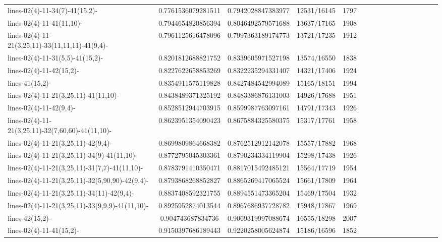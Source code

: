 \documentclass[12pt]{report}			%
\begin{document}
\begin{landscape}
\begin{longtable}{ | p{5cm} | *{15}{c|}}
lines-02(4)-11-34(7)-41(15,2)-                    & 0.7761536079281511  & 0.7942028847383977  & 12531/16145 & 1797 \\
lines-02(4)-11-41(11,10)-                         & 0.7944654820856394  & 0.8046492579571688  & 13637/17165 & 1908 \\
lines-02(4)-11-21(3,25,11)-33(11,11,11)-41(9,4)-   & 0.7961125616478096  & 0.7997363189174773  & 13721/17235 & 1912 \\
lines-02(4)-11-31(5,5)-41(15,2)-                  & 0.8201812688821752  & 0.8339605971527198  & 13574/16550 & 1838 \\
lines-02(4)-11-42(15,2)-                          & 0.8227622658853269  & 0.8322235294331407  & 14321/17406 & 1924 \\
lines-41(15,2)-                                   & 0.8354911575119828  & 0.8427484542994089  & 15165/18151 & 1994 \\
lines-02(4)-11-21(3,25,11)-41(11,10)-             & 0.8438489371325192  & 0.8483386876131003  & 14926/17688 & 1951 \\
lines-02(4)-11-42(9,4)-                           & 0.8528512944703915  & 0.8599987763097161  & 14791/17343 & 1926 \\
lines-02(4)-11-21(3,25,11)-32(7,60,60)-41(11,10)- & 0.8623951354090423  & 0.8675884325580375  & 15317/17761 & 1958 \\
lines-02(4)-11-21(3,25,11)-42(9,4)-               & 0.8699809864668382  & 0.8762512912142078  & 15557/17882 & 1968 \\
lines-02(4)-11-21(3,25,11)-34(9)-41(11,10)-       & 0.8772795045303361  & 0.8790234334119904  & 15298/17438 & 1926 \\
lines-02(4)-11-21(3,25,11)-31(7,7)-41(11,10)-     & 0.8783791410350471  & 0.8817015492485121  & 15564/17719 & 1954 \\
lines-02(4)-11-21(3,25,11)-32(5,90,90)-42(9,4)-   & 0.8793868268852827  & 0.8865269417065524  & 15661/17809 & 1964 \\
lines-02(4)-11-21(3,25,11)-34(11)-42(9,4)-        & 0.8837408592321755  & 0.8894551473365204  & 15469/17504 & 1932 \\
lines-02(4)-11-21(3,25,11)-33(9,9,9)-41(11,10)-   & 0.8925952874013544  & 0.8967686937728782  & 15948/17867 & 1969 \\
lines-42(15,2)-                                   & 0.904743687834736   & 0.9069319997088674  & 16555/18298 & 2007 \\
lines-02(4)-11-41(15,2)-                          & 0.9150397686189443  & 0.9220258005624874  & 15186/16596 & 1852 \\

\end{longtable}
\end{landscape}
\end{document}
